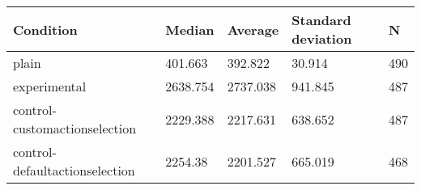 \begin{center}
\begin{tabular}{|l|l|l|l|l|}
\hline
Condition & Median & Average & Standard deviation & N \\
\hline
plain & 401.663 & 392.822 & 30.914 & 490 \\
experimental & 2638.754 & 2737.038 & 941.845 & 487 \\
control-customactionselection & 2229.388 & 2217.631 & 638.652 & 487 \\
control-defaultactionselection & 2254.38 & 2201.527 & 665.019 & 468 \\
\hline
\end{tabular}
\end{center}
